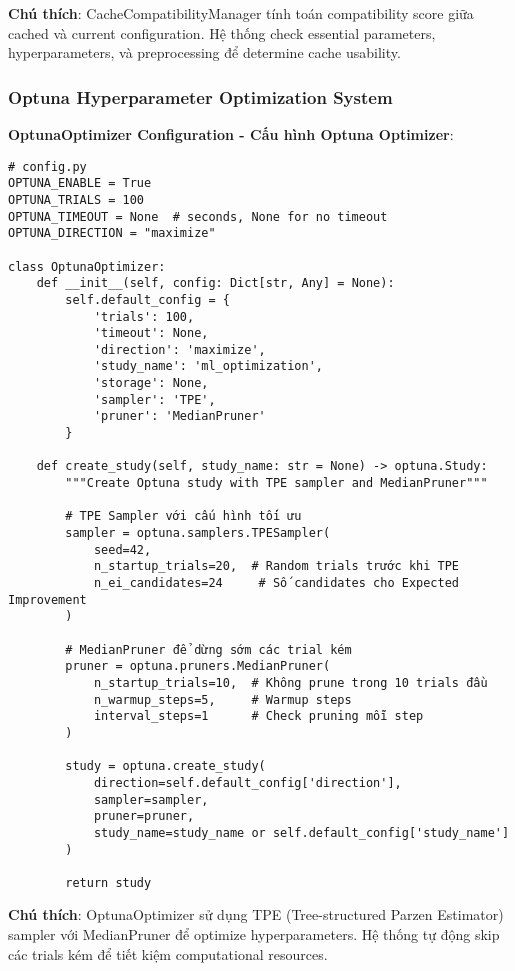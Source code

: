 \textbf{Chú thích}: CacheCompatibilityManager tính toán compatibility score giữa cached và current configuration. Hệ thống check essential parameters, hyperparameters, và preprocessing để determine cache usability.

\subsubsection{Optuna Hyperparameter Optimization System}

\textbf{OptunaOptimizer Configuration - Cấu hình Optuna Optimizer}:

\begin{verbatim}
# config.py
OPTUNA_ENABLE = True
OPTUNA_TRIALS = 100
OPTUNA_TIMEOUT = None  # seconds, None for no timeout
OPTUNA_DIRECTION = "maximize"

class OptunaOptimizer:
    def __init__(self, config: Dict[str, Any] = None):
        self.default_config = {
            'trials': 100,
            'timeout': None,
            'direction': 'maximize',
            'study_name': 'ml_optimization',
            'storage': None,
            'sampler': 'TPE',
            'pruner': 'MedianPruner'
        }
        
    def create_study(self, study_name: str = None) -> optuna.Study:
        """Create Optuna study with TPE sampler and MedianPruner"""
        
        # TPE Sampler với cấu hình tối ưu
        sampler = optuna.samplers.TPESampler(
            seed=42,
            n_startup_trials=20,  # Random trials trước khi TPE
            n_ei_candidates=24     # Số candidates cho Expected Improvement
        )
        
        # MedianPruner để dừng sớm các trial kém
        pruner = optuna.pruners.MedianPruner(
            n_startup_trials=10,  # Không prune trong 10 trials đầu
            n_warmup_steps=5,     # Warmup steps
            interval_steps=1      # Check pruning mỗi step
        )
        
        study = optuna.create_study(
            direction=self.default_config['direction'],
            sampler=sampler,
            pruner=pruner,
            study_name=study_name or self.default_config['study_name']
        )
        
        return study
\end{verbatim}

\textbf{Chú thích}: OptunaOptimizer sử dụng TPE (Tree-structured Parzen Estimator) sampler với MedianPruner để optimize hyperparameters. Hệ thống tự động skip các trials kém để tiết kiệm computational resources.

